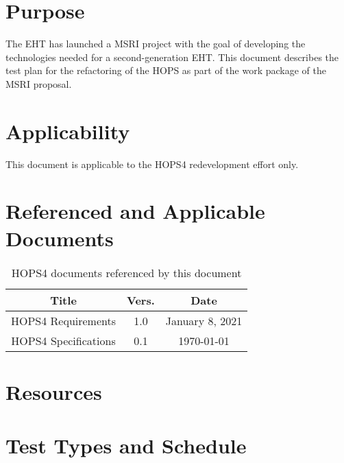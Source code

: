 \documentclass[notitlepage,letterpaper,pdftex,12pt,final]{article}
\numberwithin{equation}{section}
\newcommand{\recdate}{\today}
\begin{document}
\section{Purpose}
\label{sec:purpose}
The \ac{EHT} has launched a \ac{MSRI} project with the goal of developing
the technologies needed for a second-generation \acs{EHT}. 
This document describes the test plan for the refactoring of the \ac{HOPS}
as part of the work package of the \acs{MSRI} proposal. 

\section{Applicability}
\label{sec:applicability}
This document is applicable to the HOPS4 redevelopment effort only.

\section{Referenced and Applicable Documents}
\label{sec:referenced-docs}
\begin{table}[h!]
\centering
 \begin{tabular}{c | c | c } 
 Title & Vers. & Date \\ [0.5ex]
 \hline%
 HOPS4 Requirements & 1.0 & January 8, 2021 \\ [1ex]
 HOPS4 Specifications & 0.1 & \recdate \\
 \end{tabular}
 \caption{HOPS4 documents referenced by this document}
 \label{table:1}
\end{table}

\section{Resources}
\label{sec:resources}


\section{Test Types and Schedule}
\label{sec:schedule}
\end{document}

